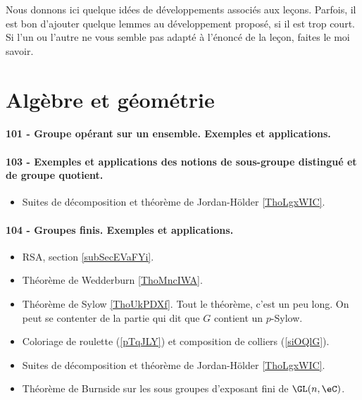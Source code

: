 
Nous donnons ici quelque idées de développements associés aux leçons. Parfois, il est bon d'ajouter quelque lemmes au développement proposé, si il est trop court. Si l'un ou l'autre ne vous semble pas adapté à l'énoncé de la leçon, faites le moi savoir.

\section{Algèbre et géométrie}


\paragraph{101 - Groupe opérant sur un ensemble. Exemples et applications.}
\paragraph{103 - Exemples et applications des notions de sous-groupe distingué et de groupe quotient.}
\begin{itemize}
    \item Suites de décomposition et théorème de Jordan-Hölder \ref{ThoLgxWIC}.
\end{itemize}

\paragraph{104 - Groupes finis. Exemples et applications.}
\begin{itemize}
    \item RSA, section \ref{subSecEVaFYi}.
    \item Théorème de Wedderburn \ref{ThoMncIWA}.
    \item Théorème de Sylow \ref{ThoUkPDXf}. Tout le théorème, c'est un peu long. On peut se contenter de la partie qui dit que \( G\) contient un \( p\)-Sylow.
    \item Coloriage de roulette (\ref{pTqJLY}) et composition de colliers (\ref{siOQlG}).
    \item Suites de décomposition et théorème de Jordan-Hölder \ref{ThoLgxWIC}.
    \item Théorème de Burnside sur les sous groupes d'exposant fini de \( \GL(n,\eC)\).
\end{itemize}


